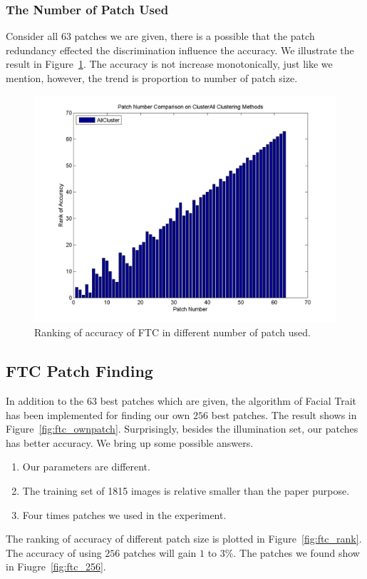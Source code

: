 \documentclass[10pt,twocolumn,letterpaper]{article}
\begin{document}
\subsubsection{The Number of Patch Used}
Consider all 63 patches we are given, there is a possible that the patch
redundancy effected the discrimination influence the accuracy. We illustrate the 
result in Figure~\ref{fig:ftc_npatch}. The accuracy is not increase monotonically,
just like we mention, however, the trend is proportion to number of patch size.

\begin{figure}[t]
    \begin{center}
        \includegraphics[width=0.8\linewidth]{fig/ftc/ftc_npatch.png}
    \end{center}
    \caption{Ranking of accuracy of FTC in different number of patch used.}
    \label{fig:ftc_npatch}
\end{figure}


\subsection{FTC Patch Finding}
In addition to the $63$ best patches which are given, the algorithm of Facial Trait has
been implemented for finding our own $256$ best patches. The result shows in
Figure~\ref{fig:ftc_ownpatch}. Surprisingly, besides the illumination set,
our patches has better accuracy. We bring up some possible answers.
\begin{enumerate}
    \item Our parameters are different.
    \item The training set of 1815 images is relative smaller than the paper purpose.
    \item Four times patches we used in the experiment.
\end{enumerate}
The ranking of accuracy of different patch size is plotted in 
Figure~\ref{fig:ftc_rank}. The accuracy of using $256$ patches will gain
$1$ to $3\%$. The patches we found show in Fiugre~\ref{fig:ftc_256}.
\end{document}
